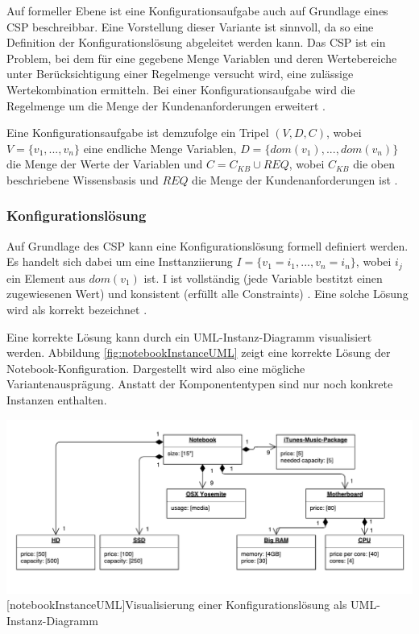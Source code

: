 \documentclass[12pt,a4paper,bibliography=totocnumbered,listof=totoc]{scrartcl}
\begin{document}
Auf formeller Ebene ist eine Konfigurationsaufgabe auch auf Grundlage eines \ac{CSP} beschreibbar. Eine Vorstellung dieser Variante ist sinnvoll, da so eine Definition der Konfigurationslösung abgeleitet werden kann. Das \ac{CSP} ist ein Problem, bei dem für eine gegebene Menge Variablen und deren Wertebereiche unter Berücksichtigung einer Regelmenge versucht wird, eine zulässige Wertekombination ermitteln. Bei einer Konfigurationsaufgabe wird die Regelmenge um die Menge der Kundenanforderungen erweitert \citep{felferning14}.

Eine Konfigurationsaufgabe ist demzufolge ein Tripel $(V, D, C)$, wobei $V = \{v_1, ..., v_n\}$ eine endliche Menge Variablen,  $D  = \{dom(v_1), ..., dom(v_n)\}$ die Menge der Werte der Variablen und $C = C_{KB} \cup REQ$, wobei $C_{KB}$ die oben beschriebene Wissensbasis und $REQ$ die Menge der Kundenanforderungen ist \citep{felferning14}.

\subsubsection{Konfigurationslösung}
Auf Grundlage des \ac{CSP} kann eine Konfigurationslösung formell definiert werden. Es handelt sich dabei um eine Insttanziierung $I = \{v_1 = i_1, ..., v_n = i_n\}$, wobei $i_j$ ein Element aus $dom(v_1)$ ist. I ist vollständig (jede Variable bestitzt einen zugewiesenen Wert) und konsistent (erfüllt alle Constraints) \citep{falkner11}. Eine solche Lösung wird als korrekt bezeichnet \citep{soininen98}.

Eine korrekte Lösung kann durch ein UML-Instanz-Diagramm visualisiert werden.  Abbildung \ref{fig:notebookInstanceUML} zeigt eine korrekte Lösung der Notebook-Konfiguration. Dargestellt wird also eine mögliche Variantenausprägung. Anstatt der Komponententypen sind nur noch konkrete Instanzen enthalten.

\vspace{1em}
\begin{minipage}{\linewidth}
	\centering
	\includegraphics[width=1\linewidth]{Abbildungen/notebookInstanceUML.pdf}
	[notebookInstanceUML]{Visualisierung einer Konfigurationslösung als UML-Instanz-Diagramm}
	\label{fig:notebookInstanceUML}
\end{minipage}
\vspace{1em}
\end{document}
